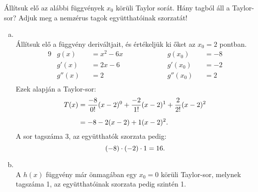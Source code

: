 \begin{exercise}{%
    Állítsuk elő az alábbi függvények $x_0$ körüli Taylor sorát.
    Hány tagból áll a Taylor-sor? Adjuk meg a nemzérus tagok együtthatóinak
    szorzatát!
  }
{\begin{enumerate}[a)]
      \item {}\\[1mm]
            Állítsuk elő a függvény deriváltjait, és értékeljük ki őket az
            $x_0 = 2$ pontban.
            \begin{alignat*}{9}
               & g(x)   &  & = x^2 - 6x \hspace{2cm} &  & g(x_0)   &  & = -8 \\
               & g'(x)  &  & = 2x - 6 \hspace{2cm}   &  & g'(x_0)  &  & = -2 \\
               & g''(x) &  & = 2 \hspace{2cm}        &  & g''(x_0) &  & = 2  \\
            \end{alignat*}
            Ezek alapján a Taylor-sor:
            \begin{align*}
              T(x)
               & = \frac{-8}{0!}(x - 2)^0
              + \frac{-2}{1!}(x - 2)^1
              + \frac{2}{2!}(x - 2)^2
              \\[2mm]
               & = -8
              - 2(x - 2)
              + 1(x - 2)^2
              \text.
            \end{align*}
            A sor tagszáma 3, az együtthatók szorzata pedig:
            \[
              (-8) \cdot (-2) \cdot 1 = 16
              \text.
            \]

      \item {}\\[1mm]
            A $h(x)$ függvény már önmagában egy $x_0 = 0$ körüli Taylor-sor,
            melynek tagszáma 1, az együtthatóinak szorzata pedig szintén 1.
    \end{enumerate}
  }
\end{exercise}
